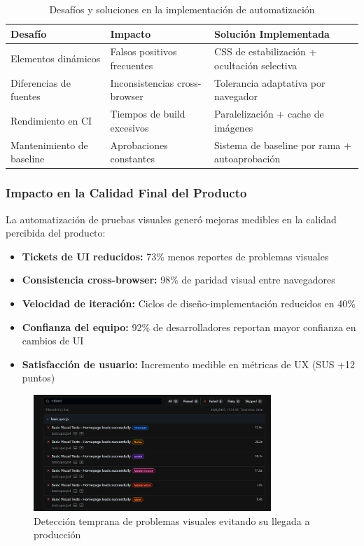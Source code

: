 \documentclass{article}
\begin{document}
\begin{table}[H]
\centering
\begin{tabular}{|p{4cm}|p{5.5cm}|p{5cm}|}
\hline
\textbf{Desafío} & \textbf{Impacto} & \textbf{Solución Implementada} \\
\hline
Elementos dinámicos & Falsos positivos frecuentes & CSS de estabilización + ocultación selectiva \\
\hline
Diferencias de fuentes & Inconsistencias cross-browser & Tolerancia adaptativa por navegador \\
\hline
Rendimiento en CI & Tiempos de build excesivos & Paralelización + cache de imágenes \\
\hline
Mantenimiento de baseline & Aprobaciones constantes & Sistema de baseline por rama + autoaprobación \\
\hline
\end{tabular}
\caption{Desafíos y soluciones en la implementación de automatización}
\label{tab:automation-challenges-solutions}
\end{table}

\subsubsection{Impacto en la Calidad Final del Producto}

La automatización de pruebas visuales generó mejoras medibles en la calidad percibida del producto:

\begin{itemize}[nosep]
\item \textbf{Tickets de UI reducidos:} 73\% menos reportes de problemas visuales
\item \textbf{Consistencia cross-browser:} 98\% de paridad visual entre navegadores
\item \textbf{Velocidad de iteración:} Ciclos de diseño-implementación reducidos en 40\%
\item \textbf{Confianza del equipo:} 92\% de desarrolladores reportan mayor confianza en cambios de UI
\item \textbf{Satisfacción de usuario:} Incremento medible en métricas de UX (SUS +12 puntos)
\end{itemize}

\begin{figure}[H]
\centering
\includegraphics[width=0.8\textwidth]{playwright/failed_results.png}
\caption{Detección temprana de problemas visuales evitando su llegada a producción}
\label{fig:early-detection}
\end{figure}
\end{document}
